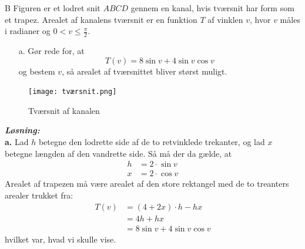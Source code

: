 \documentclass{article}
\newcommand{\sol}{\setlength{\parindent}{0cm}\textbf{\textit{Løsning:}}\setlength{\parindent}{1cm}}
\begin{document}
\begin{question}{B}{}
 Figuren er et lodret snit $ABCD$ gennem en kanal, hvis tværsnit har form som et trapez.
  Arealet af kanalens tværsnit er en funktion $T$ af vinklen $v$, hvor $v$ måles i radianer og $0<v\leq \frac{\pi}{2}$. 
  \begin{itemize}
    \item[a.] Gør rede for, at
    \[
    T(v)=8 \sin v + 4 \sin v \cos v
    \] 
    og bestem $v$, så arealet af tværsnittet bliver størst muligt.
  \end{itemize}
\end{question}
\begin{figure}[H]
\begin{center}
  \texttt{[image: tværsnit.png]}
\end{center}
\caption{Tværsnit af kanalen}
\label{fig:kanal}
\end{figure}
\sol \\ 
\textbf{a.} Lad $h$ betegne den lodrette side af de to retvinklede trekanter, og lad $x$ betegne længden af den vandrette side. 
Så må der da gælde, at 
\begin{equation*}
\begin{split}
  h&=2\cdot \sin v \\
  x&=2\cdot \cos v
\end{split}
\end{equation*}
Arealet af trapezen må være arealet af den store rektangel med de to treanters arealer trukket fra:
\begin{equation*}
\begin{split}
  T(v)&=(4+2x)\cdot h - hx \\
  &=4h + hx \\ 
  &=8 \sin v + 4 \sin v \cos v
\end{split}
\end{equation*}
hvilket var, hvad vi skulle vise.
\end{document}
